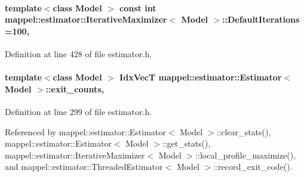 \paragraph[{\texorpdfstring{Default\+Iterations}{DefaultIterations}}]{\setlength{\rightskip}{0pt plus 5cm}template$<$class Model $>$ const int {\bf mappel\+::estimator\+::\+Iterative\+Maximizer}$<$ Model $>$\+::Default\+Iterations =100\hspace{0.3cm}{\ttfamily [static]}, {\ttfamily [inherited]}}\hypertarget{classmappel_1_1estimator_1_1IterativeMaximizer_ab66c01c2eee630f3fca119f3fe09a19a}{}\label{classmappel_1_1estimator_1_1IterativeMaximizer_ab66c01c2eee630f3fca119f3fe09a19a}


Definition at line 428 of file estimator.\+h.

\paragraph[{\texorpdfstring{exit\+\_\+counts}{exit_counts}}]{\setlength{\rightskip}{0pt plus 5cm}template$<$class Model $>$ {\bf Idx\+VecT} {\bf mappel\+::estimator\+::\+Estimator}$<$ Model $>$\+::exit\+\_\+counts\hspace{0.3cm}{\ttfamily [protected]}, {\ttfamily [inherited]}}\hypertarget{classmappel_1_1estimator_1_1Estimator_aa946d9789a1299d684f83a822a10caa7}{}\label{classmappel_1_1estimator_1_1Estimator_aa946d9789a1299d684f83a822a10caa7}


Definition at line 299 of file estimator.\+h.



Referenced by mappel\+::estimator\+::\+Estimator$<$ Model $>$\+::clear\+\_\+stats(), mappel\+::estimator\+::\+Estimator$<$ Model $>$\+::get\+\_\+stats(), mappel\+::estimator\+::\+Iterative\+Maximizer$<$ Model $>$\+::local\+\_\+profile\+\_\+maximize(), and mappel\+::estimator\+::\+Threaded\+Estimator$<$ Model $>$\+::record\+\_\+exit\+\_\+code().

